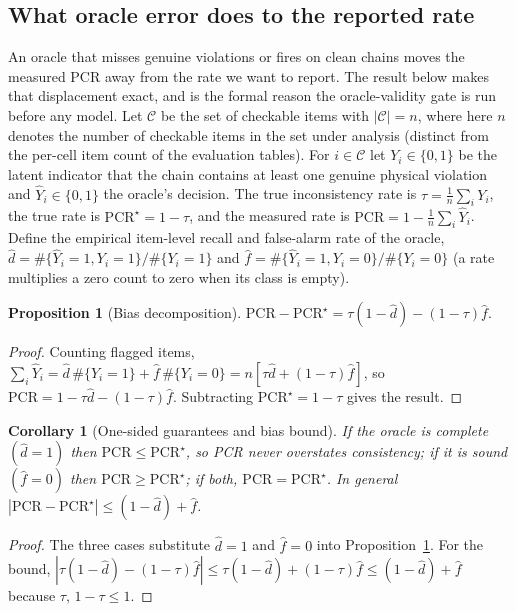 \documentclass[pdflatex,sn-nature]{sn-jnl}
\newtheorem{proposition}{Proposition}
\newtheorem{corollary}{Corollary}
\begin{document}
\subsection*{What oracle error does to the reported rate}
An oracle that misses genuine violations or fires on clean chains moves the measured PCR away
from the rate we want to report. The result below makes that displacement exact, and is the
formal reason the oracle-validity gate is run before any model. Let
$\mathcal{C}$ be the set of checkable items with $|\mathcal{C}|=n$, where here $n$ denotes
the number of checkable items in the set under analysis (distinct from the per-cell item
count of the evaluation tables). For
$i\in\mathcal{C}$ let $Y_i\in\{0,1\}$ be the latent indicator that the chain contains
at least one genuine physical violation and $\hat Y_i\in\{0,1\}$ the oracle's decision.
The true inconsistency rate is $\tau=\frac{1}{n}\sum_i Y_i$, the true rate is
$\mathrm{PCR}^\star=1-\tau$, and the measured rate is
$\mathrm{PCR}=1-\frac{1}{n}\sum_i\hat Y_i$. Define the empirical item-level recall and
false-alarm rate of the oracle,
$\hat d=\#\{\hat Y_i{=}1,Y_i{=}1\}/\#\{Y_i{=}1\}$ and
$\hat f=\#\{\hat Y_i{=}1,Y_i{=}0\}/\#\{Y_i{=}0\}$ (a rate multiplies a zero
count to zero when its class is empty).

\begin{proposition}[Bias decomposition]\label{prop:bias}
$\mathrm{PCR}-\mathrm{PCR}^\star=\tau(1-\hat d)-(1-\tau)\hat f.$
\end{proposition}
\begin{proof}
Counting flagged items,
$\sum_i\hat Y_i=\hat d\,\#\{Y_i{=}1\}+\hat f\,\#\{Y_i{=}0\}=n[\tau\hat d+(1-\tau)\hat f]$,
so $\mathrm{PCR}=1-\tau\hat d-(1-\tau)\hat f$. Subtracting $\mathrm{PCR}^\star=1-\tau$
gives the result.
\end{proof}

\begin{corollary}[One-sided guarantees and bias bound]\label{cor:onesided}
If the oracle is complete $(\hat d=1)$ then $\mathrm{PCR}\le\mathrm{PCR}^\star$, so PCR
never overstates consistency; if it is sound $(\hat f=0)$ then
$\mathrm{PCR}\ge\mathrm{PCR}^\star$; if both, $\mathrm{PCR}=\mathrm{PCR}^\star$. In
general $|\mathrm{PCR}-\mathrm{PCR}^\star|\le(1-\hat d)+\hat f$.
\end{corollary}
\begin{proof}
The three cases substitute $\hat d=1$ and $\hat f=0$ into
Proposition~\ref{prop:bias}. For the bound,
$|\tau(1-\hat d)-(1-\tau)\hat f|\le\tau(1-\hat d)+(1-\tau)\hat f\le(1-\hat d)+\hat f$
because $\tau,\,1-\tau\le1$.
\end{proof}
\end{document}
